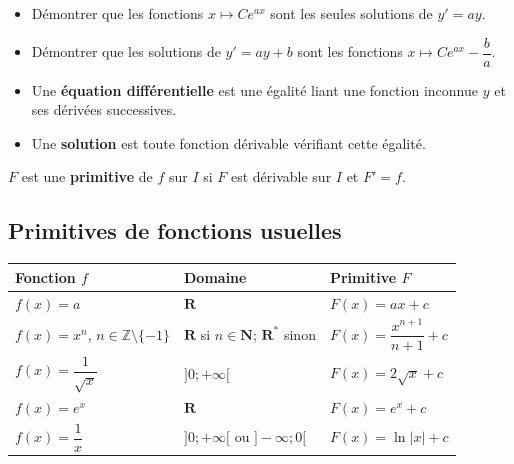 \documentclass[11pt,a4paper,openany]{book}
\theoremstyle{definition}
\begin{document}
    \begin{demoprogbox}
    \begin{itemize}
        \item Démontrer que les fonctions $x\mapsto Ce^{ax}$ sont les seules solutions de $y'=ay$.
        \item Démontrer que les solutions de $y'=ay+b$ sont les fonctions $x\mapsto Ce^{ax}-\dfrac{b}{a}$.
    \end{itemize}
    \end{demoprogbox}

    \begin{Définition}
    \begin{itemize}
        \item Une \textbf{équation différentielle} est une égalité liant une fonction
              inconnue $y$ et ses dérivées successives.
        \item Une \textbf{solution} est toute fonction dérivable vérifiant cette égalité.
    \end{itemize}
    \end{Définition}

    \begin{Définition}
        $F$ est une \textbf{primitive} de $f$ sur $I$ si $F$ est dérivable sur $I$ et
        $F'=f$.
    \end{Définition}

    \subsection{Primitives de fonctions usuelles}
    \renewcommand{\arraystretch}{2}
    \begin{tabular}{|m{5cm}|m{4cm}|m{7cm}|}
        \hline
        Fonction $f$ & Domaine & Primitive $F$ \\
        \hline
        $f(x)=a$ & $\mathbf{R}$ & $F(x)=ax+c$ \\
        \hline
        $f(x)=x^n$, $n\in\mathbb{Z}\setminus\{-1\}$ &
            $\mathbf{R}$ si $n\in\mathbf{N}$;\; $\mathbf{R}^*$ sinon &
            $F(x)=\dfrac{x^{n+1}}{n+1}+c$ \\
        \hline
        $f(x)=\dfrac{1}{\sqrt{x}}$ & $]0;+\infty[$ & $F(x)=2\sqrt{x}+c$ \\
        \hline
        $f(x)=e^x$ & $\mathbf{R}$ & $F(x)=e^x+c$ \\
        \hline
        $f(x)=\dfrac{1}{x}$ & $]0;+\infty[$ ou $]-\infty;0[$ & $F(x)=\ln|x|+c$ \\
        \hline
    \end{tabular}
\end{document}
